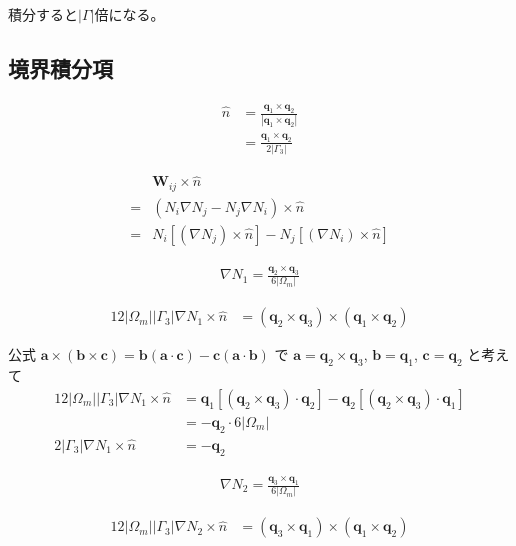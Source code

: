 積分すると$\left|\Gamma\right|$倍になる。

\subsection{境界積分項}

\begin{align}
\hat{n}&=\frac{
\bm{q}_1\times\bm{q}_2
}{
\left|\bm{q}_1\times\bm{q}_2\right|
}\\
&=\frac{\bm{q}_1\times\bm{q}_2}{2\left|\Gamma_3\right|}
\end{align}

\begin{align}
&\bm{W}_{ij}\times\hat{n}\\
=&\left(N_i\nabla N_j-N_j\nabla N_i\right)\times\hat{n}\\
=&N_i\left[\left(\nabla N_j\right)\times\hat{n}\right]
 -N_j\left[\left(\nabla N_i\right)\times\hat{n}\right]
\end{align}

\begin{align}
\nabla N_1 = \frac{\bm{q}_2\times\bm{q}_3}{6\left|\Omega_m\right|}
\end{align}

\begin{align}
12\left|\Omega_m\right|\left|\Gamma_3\right|\nabla N_1\times\hat{n}
&=\left(\bm{q}_2\times\bm{q}_3\right)\times\left(\bm{q}_1\times\bm{q}_2\right)
\end{align}

公式
$\bm{a}\times\left(\bm{b}\times\bm{c}\right)
=\bm{b}\left(\bm{a}\cdot\bm{c}\right)
-\bm{c}\left(\bm{a}\cdot\bm{b}\right)$
で
$\bm{a}=\bm{q}_2\times\bm{q}_3$, $\bm{b}=\bm{q}_1$, $\bm{c}=\bm{q}_2$
と考えて
\begin{align}
12\left|\Omega_m\right|\left|\Gamma_3\right|\nabla N_1\times\hat{n}
&=\bm{q}_1\left[\left(\bm{q}_2\times\bm{q}_3\right)\cdot\bm{q}_2\right]
 -\bm{q}_2\left[\left(\bm{q}_2\times\bm{q}_3\right)\cdot\bm{q}_1\right]\\
&=-\bm{q}_2\cdot6\left|\Omega_m\right|\\
2\left|\Gamma_3\right|\nabla N_1\times\hat{n}
&=-\bm{q}_2
\end{align}

\begin{align}
\nabla N_2 = \frac{\bm{q}_3\times\bm{q}_1}{6\left|\Omega_m\right|}
\end{align}

\begin{align}
12\left|\Omega_m\right|\left|\Gamma_3\right|\nabla N_2\times\hat{n}
&=\left(\bm{q}_3\times\bm{q}_1\right)\times\left(\bm{q}_1\times\bm{q}_2\right)
\end{align}

